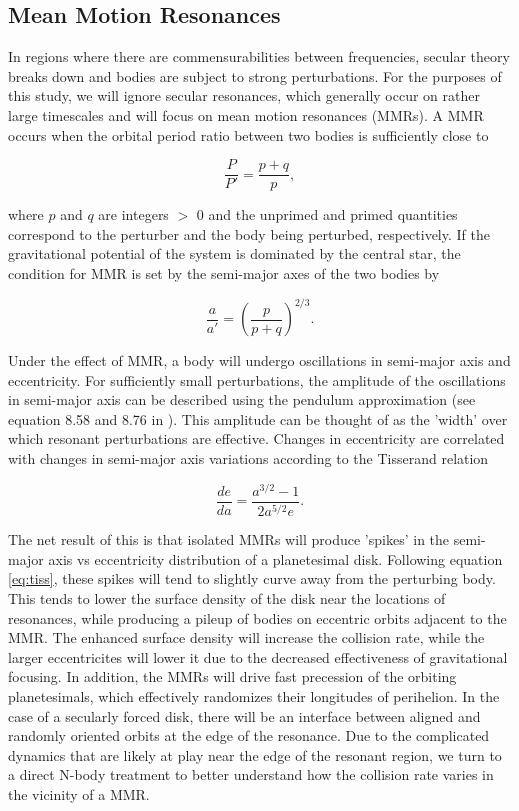 \documentclass[onecolumn]{aastex63}
\begin{document}
\subsection{Mean Motion Resonances}

In regions where there are commensurabilities between frequencies, secular theory breaks down and bodies are subject to strong 
perturbations. For the purposes of this study, we will ignore secular resonances, which generally occur on rather large timescales 
and will focus on mean motion resonances (MMRs). A MMR occurs  when the orbital period ratio between two bodies is sufficiently 
close to

\begin{equation}\label{eq:per_mmr}
	\frac{P}{P'} = \frac{p + q}{p},
\end{equation}

\noindent where  $p$ and $q$ are integers $>$ 0 and the unprimed and primed quantities correspond to the perturber and the body 
being perturbed, respectively. If the gravitational potential of the system is dominated by the central star, the condition for MMR is set 
by the semi-major axes of the two bodies by

\begin{equation}\label{eq:a_mmr}
	\frac{a}{a'} = \left( \frac{p}{p + q} \right)^{2/3}.
\end{equation}

Under the effect of MMR, a body will undergo oscillations in semi-major axis and eccentricity. For sufficiently small perturbations,
the amplitude of the oscillations in semi-major axis can be 
described using the pendulum approximation (see equation 8.58 and 8.76 in \citet{2000ssd..book.....M}). This amplitude can be thought of 
as the 'width' over which resonant perturbations are effective. Changes in eccentricity are correlated with changes in semi-major axis 
variations according to the Tisserand relation

\begin{equation}\label{eq:tiss}
	\frac{de}{da} = \frac{a^{3/2} - 1}{2 a^{5/2} e}.
\end{equation}

The net result of this is that isolated MMRs will produce 'spikes' in the semi-major axis vs eccentricity distribution of a planetesimal 
disk. Following equation \ref{eq:tiss}, these spikes will tend to slightly curve away from the perturbing body. This tends to lower the surface 
density of the disk near the locations of resonances, while producing a pileup of bodies on eccentric orbits adjacent to the MMR. The 
enhanced surface density will increase the collision rate, while the larger eccentricites will lower it due to the decreased effectiveness of 
gravitational focusing. In addition, the MMRs will drive fast precession of the orbiting planetesimals, which effectively randomizes their 
longitudes of perihelion. In the case of a secularly forced disk, there will be an interface between aligned and randomly oriented orbits at 
the edge of the resonance. Due to the complicated dynamics that are likely at play near the edge of the resonant region, we turn to a direct 
N-body treatment to better understand how the collision rate varies in the vicinity of a MMR.
\end{document}
